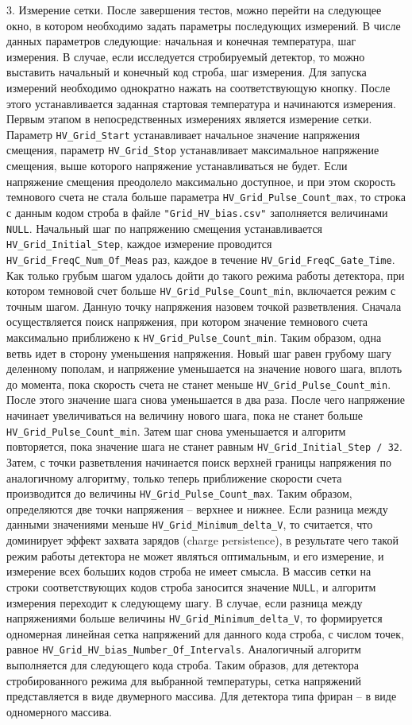 \documentclass[12pt]{article}
\begin{document}
3. Измерение сетки. После завершения тестов, можно перейти на следующее окно, в котором необходимо задать параметры последующих измерений. В числе данных параметров следующие: начальная и конечная температура, шаг измерения. В случае, если исследуется стробируемый детектор, то можно выставить начальный и конечный код строба, шаг измерения. Для запуска измерений необходимо однократно нажать на  соответствующую кнопку. После этого устанавливается заданная стартовая температура и начинаются измерения. Первым этапом в непосредственных измерениях является измерение сетки. Параметр \verb|HV_Grid_Start| устанавливает начальное значение напряжения смещения, параметр \verb|HV_Grid_Stop| устанавливает максимальное напряжение смещения, выше которого напряжение устанавливаться не будет. Если напряжение смещения преодолело максимально доступное, и при этом скорость темнового счета не стала больше параметра \verb|HV_Grid_Pulse_Count_max|, то строка с данным кодом строба в файле \verb|"Grid_HV_bias.csv"| заполняется величинами \verb|NULL|. Начальный шаг по напряжению смещения устанавливается \verb|HV_Grid_Initial_Step|, каждое измерение проводится \verb|HV_Grid_FreqC_Num_Of_Meas| раз, каждое в течение \verb|HV_Grid_FreqC_Gate_Time|. Как только грубым шагом удалось дойти до такого режима работы детектора, при котором темновой счет больше \verb|HV_Grid_Pulse_Count_min|, включается режим с точным шагом. Данную точку напряжения назовем точкой разветвления. Сначала осуществляется поиск напряжения, при котором значение темнового счета максимально приближено к \verb|HV_Grid_Pulse_Count_min|. Таким образом, одна ветвь идет в сторону уменьшения напряжения. Новый шаг равен грубому шагу деленному пополам, и напряжение уменьшается на значение нового шага, вплоть до момента, пока скорость счета не станет меньше \verb|HV_Grid_Pulse_Count_min|. После этого значение шага снова уменьшается в два раза. После чего напряжение начинает увеличиваться на величину нового шага, пока не станет больше \verb|HV_Grid_Pulse_Count_min|. Затем шаг снова уменьшается и алгоритм повторяется, пока значение шага не станет равным \verb|HV_Grid_Initial_Step / 32|. Затем, с точки разветвления начинается поиск верхней границы напряжения по аналогичному алгоритму, только теперь приближение скорости счета производится до величины \verb|HV_Grid_Pulse_Count_max|. Таким образом, определяются две точки напряжения -- верхнее и нижнее. Если разница между данными значениями меньше \verb|HV_Grid_Minimum_delta_V|, то считается, что доминирует эффект захвата зарядов (charge persistence), в результате чего такой режим работы детектора не может являться оптимальным, и его измерение, и измерение всех больших кодов строба не имеет смысла. В массив сетки на строки соответствующих кодов строба заносится значение \verb|NULL|, и алгоритм измерения переходит к следующему шагу. В случае, если разница между напряжениями больше величины \verb|HV_Grid_Minimum_delta_V|, то формируется одномерная линейная сетка напряжений для данного кода строба, с числом точек, равное \verb|HV_Grid_HV_bias_Number_Of_Intervals|. Аналогичный алгоритм выполняется для следующего кода строба. Таким образов, для детектора стробированного режима для выбранной температуры, сетка напряжений представляется в виде двумерного массива. Для детектора типа фриран -- в виде одномерного массива. 
 
\end{document}

